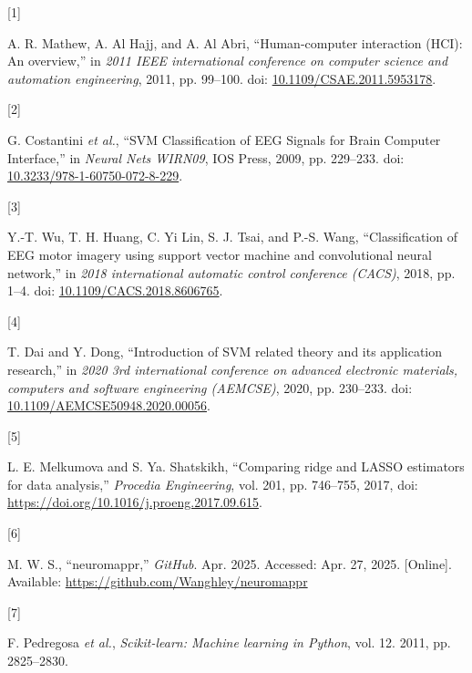 \documentclass[
  letterpaper,
  DIV=11,
  numbers=noendperiod]{scrartcl}
\newlength{\cslhangindent}
\newlength{\csllabelwidth}
\newenvironment{CSLReferences}[2] %
 {\begin{list}{}{%
  \setlength{\itemindent}{0pt}
  \setlength{\leftmargin}{0pt}
  \setlength{\parsep}{0pt}
  \ifodd #1
   \setlength{\leftmargin}{\cslhangindent}
   \setlength{\itemindent}{-1\cslhangindent}
  \fi
  \setlength{\itemsep}{#2\baselineskip}}}
 {\end{list}}
\newcommand{\CSLLeftMargin}[1]{\parbox[t]{\csllabelwidth}{\strut#1\strut}}
\newcommand{\CSLRightInline}[1]{\parbox[t]{\linewidth - \csllabelwidth}{\strut#1\strut}}
\begin{document}
\label{refs}
\begin{CSLReferences}{0}{0}
\CSLLeftMargin{{[}1{]} }%
\CSLRightInline{A. R. Mathew, A. Al Hajj, and A. Al Abri,
{``Human-computer interaction (HCI): An overview,''} in \emph{2011 IEEE
international conference on computer science and automation
engineering}, 2011, pp. 99--100. doi:
\href{https://doi.org/10.1109/CSAE.2011.5953178}{10.1109/CSAE.2011.5953178}.}

\CSLLeftMargin{{[}2{]} }%
\CSLRightInline{G. Costantini \emph{et al.}, {``{SVM Classification of
EEG Signals for Brain Computer Interface},''} in \emph{{Neural Nets
WIRN09}}, IOS Press, 2009, pp. 229--233. doi:
\href{https://doi.org/10.3233/978-1-60750-072-8-229}{10.3233/978-1-60750-072-8-229}.}

\CSLLeftMargin{{[}3{]} }%
\CSLRightInline{Y.-T. Wu, T. H. Huang, C. Yi Lin, S. J. Tsai, and P.-S.
Wang, {``Classification of EEG motor imagery using support vector
machine and convolutional neural network,''} in \emph{2018 international
automatic control conference (CACS)}, 2018, pp. 1--4. doi:
\href{https://doi.org/10.1109/CACS.2018.8606765}{10.1109/CACS.2018.8606765}.}

\CSLLeftMargin{{[}4{]} }%
\CSLRightInline{T. Dai and Y. Dong, {``Introduction of SVM related
theory and its application research,''} in \emph{2020 3rd international
conference on advanced electronic materials, computers and software
engineering (AEMCSE)}, 2020, pp. 230--233. doi:
\href{https://doi.org/10.1109/AEMCSE50948.2020.00056}{10.1109/AEMCSE50948.2020.00056}.}

\CSLLeftMargin{{[}5{]} }%
\CSLRightInline{L. E. Melkumova and S. Ya. Shatskikh, {``Comparing ridge
and LASSO estimators for data analysis,''} \emph{Procedia Engineering},
vol. 201, pp. 746--755, 2017, doi:
\url{https://doi.org/10.1016/j.proeng.2017.09.615}.}

\CSLLeftMargin{{[}6{]} }%
\CSLRightInline{M. W. S., {``{neuromappr},''} \emph{GitHub}. Apr. 2025.
Accessed: Apr. 27, 2025. {[}Online{]}. Available:
\url{https://github.com/Wanghley/neuromappr}}

\CSLLeftMargin{{[}7{]} }%
\CSLRightInline{F. Pedregosa \emph{et al.}, \emph{Scikit-learn: Machine
learning in {P}ython}, vol. 12. 2011, pp. 2825--2830.}


\end{CSLReferences}
\end{document}

